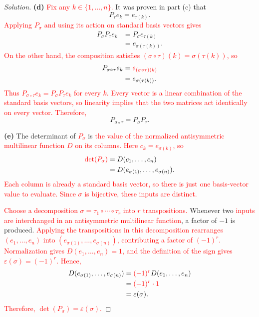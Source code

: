 \begin{proof}[Solution]
\textbf{(d)} \textcolor{red}{Fix any \(k\in\{1,\ldots,n\}\).}
It was proven in part (c) that
\[
  P_\tau e_k=e_{\tau(k)}.
\]
\textcolor{red}{Applying \(P_\sigma\) and using its action on standard
basis vectors gives}
\begin{align*}
  P_\sigma P_\tau e_k&=P_\sigma e_{\tau(k)}\\
    &=e_{\sigma(\tau(k))}.
\end{align*}
\textcolor{red}{On the other hand, the composition satisfies
\((\sigma\circ\tau)(k)=\sigma(\tau(k))\), so}
\begin{align*}
  P_{\sigma\circ\tau}e_k
    &=\textcolor{red}{e_{(\sigma\circ\tau)(k)}}\\
    &=e_{\sigma(\tau(k))}.
\end{align*}
\textcolor{red}{Thus \(P_{\sigma\circ\tau}e_k=P_\sigma P_\tau e_k\)
for every \(k\). Every vector is a linear combination of the standard
basis vectors, so linearity implies that the two matrices act identically
on every vector. Therefore,}
\[
  P_{\sigma\circ\tau}=P_\sigma P_\tau.
\]

\textbf{(e)} The determinant of \textcolor{red}{\(P_\sigma\)} is
\textcolor{red}{the value of the normalized antisymmetric multilinear
function \(D\) on its columns. Here \(c_k=e_{\sigma(k)}\), so}
\begin{align*}
  \textcolor{red}{\det(P_\sigma)}&=D(c_1,\ldots,c_n)\\
    &=D(e_{\sigma(1)},\ldots,e_{\sigma(n)}).
\end{align*}
\textcolor{red}{Each column is already a standard basis vector, so there
is just one basis-vector value to evaluate. Since \(\sigma\) is bijective,
these inputs are distinct.}

\textcolor{red}{Choose a decomposition
\(\sigma=\tau_1\circ\cdots\circ\tau_r\) into \(r\) transpositions.}
Whenever two \textcolor{red}{inputs are interchanged in an antisymmetric
multilinear function}, a factor of \(-1\) is produced.
\textcolor{red}{Applying the transpositions in this decomposition
rearranges \((e_1,\ldots,e_n)\) into
\((e_{\sigma(1)},\ldots,e_{\sigma(n)})\), contributing a factor
of \((-1)^r\). Normalization gives \(D(e_1,\ldots,e_n)=1\), and
the definition of the sign gives \(\varepsilon(\sigma)=(-1)^r\). Hence,}
\begin{align*}
  D(e_{\sigma(1)},\ldots,e_{\sigma(n)})
    &=\textcolor{red}{(-1)^r}D(e_1,\ldots,e_n)\\
    &=\textcolor{red}{(-1)^r\cdot1}\\
    &=\varepsilon(\sigma).
\end{align*}
\textcolor{red}{Therefore, \(\det(P_\sigma)=\varepsilon(\sigma)\).}
\end{proof}

